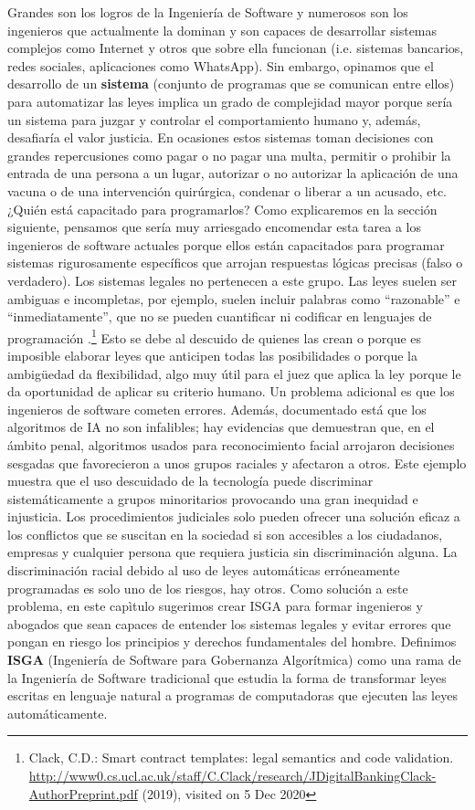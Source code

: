 \documentclass[12pt]{report} %
\begin{document}
Grandes son los logros de la Ingeniería de Software y numerosos son los ingenieros que actualmente la dominan y son capaces de desarrollar sistemas complejos como Internet y otros que sobre ella funcionan (i.e. sistemas bancarios, redes sociales, aplicaciones como WhatsApp). Sin embargo, opinamos que el desarrollo de un \textbf{sistema} (conjunto de programas que se comunican entre ellos) para automatizar las leyes implica un grado de complejidad mayor porque sería un sistema para juzgar y controlar el comportamiento humano y, además, desafiaría el valor justicia. En ocasiones estos sistemas toman decisiones con grandes repercusiones como pagar o no pagar una multa, permitir o prohibir la entrada de una persona a un lugar, autorizar o no autorizar la aplicación de una vacuna o de una intervención quirúrgica, condenar o liberar a un acusado, etc. ¿Quién está capacitado para programarlos? Como explicaremos en la sección siguiente, pensamos que sería muy arriesgado encomendar esta tarea a los ingenieros de software actuales porque ellos están capacitados para programar sistemas rigurosamente específicos que arrojan respuestas lógicas precisas (falso o verdadero). Los sistemas legales no pertenecen a este grupo. Las leyes suelen ser ambiguas e incompletas, por ejemplo, suelen incluir palabras como “razonable” e “inmediatamente”, que no se pueden cuantificar ni codificar en lenguajes de programación .\footnote{Clack, C.D.: Smart contract templates: legal semantics and code validation. \url{http://www0.cs.ucl.ac.uk/staff/C.Clack/research/JDigitalBankingClack-AuthorPreprint.pdf} (2019), visited on 5 Dec 2020} Esto se debe al descuido de quienes las crean o porque es imposible elaborar leyes que anticipen todas las posibilidades o porque la ambigüedad da flexibilidad, algo muy útil para el juez que aplica la ley porque le da oportunidad de aplicar su criterio humano. Un problema adicional es que los ingenieros de software cometen errores. Además, documentado está que los algoritmos de IA no son infalibles; hay evidencias que demuestran que, en el ámbito penal, algoritmos usados para reconocimiento facial arrojaron decisiones sesgadas que favorecieron a unos grupos raciales y afectaron a otros. Este ejemplo muestra que el uso descuidado de la tecnología puede discriminar sistemáticamente a grupos minoritarios provocando una gran inequidad e injusticia. Los procedimientos judiciales solo pueden ofrecer una solución eficaz a los conflictos que se suscitan en la sociedad si son accesibles a los ciudadanos, empresas y cualquier persona que requiera justicia sin discriminación alguna. La discriminación racial debido al uso de leyes automáticas erróneamente programadas es solo uno de los riesgos, hay otros. Como solución a este problema, en este capìtulo sugerimos crear ISGA para formar ingenieros y abogados que sean capaces de entender los sistemas legales y evitar errores que pongan en riesgo los principios y derechos fundamentales del hombre. Definimos \textbf{ISGA} (Ingeniería de Software para Gobernanza Algorítmica) como una rama de la Ingeniería de Software tradicional que estudia la forma de transformar leyes escritas en lenguaje natural a programas de computadoras que ejecuten las leyes automáticamente.
\end{document}

